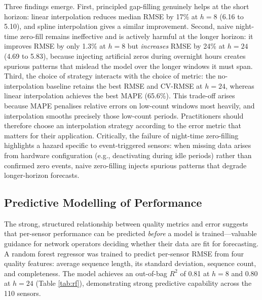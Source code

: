 \documentclass[journal,sensors,submit,pdftex,moreauthors]{Definitions/mdpi}
\begin{document}
Three findings emerge. First, principled gap-filling genuinely helps at the short horizon: linear interpolation reduces median RMSE by 17\% at $h=8$ (6.16 to 5.10), and spline interpolation gives a similar improvement. Second, naive night-time zero-fill remains ineffective and is actively harmful at the longer horizon: it improves RMSE by only 1.3\% at $h=8$ but \emph{increases} RMSE by 24\% at $h=24$ (4.69 to 5.83), because injecting artificial zeros during overnight hours creates spurious patterns that mislead the model over the longer windows it must span. Third, the choice of strategy interacts with the choice of metric: the no-interpolation baseline retains the best RMSE and CV-RMSE at $h=24$, whereas linear interpolation achieves the best MAPE (65.6\%). This trade-off arises because MAPE penalises relative errors on low-count windows most heavily, and interpolation smooths precisely those low-count periods. Practitioners should therefore choose an interpolation strategy according to the error metric that matters for their application. Critically, the failure of night-time zero-filling highlights a hazard specific to event-triggered sensors: when missing data arises from hardware configuration (e.g., deactivating during idle periods) rather than confirmed zero events, naive zero-filling injects spurious patterns that degrade longer-horizon forecasts.

\subsection{Predictive Modelling of Performance}

The strong, structured relationship between quality metrics and error suggests that per-sensor performance can be predicted \emph{before} a model is trained---valuable guidance for network operators deciding whether their data are fit for forecasting. A random forest regressor \citep{breimanRandomForests2001,pedregosaScikitlearnMachineLearning} was trained to predict per-sensor RMSE from four quality features: average sequence length, its standard deviation, sequence count, and completeness. The model achieves an out-of-bag $R^2$ of 0.81 at $h=8$ and 0.80 at $h=24$ (Table \ref{tab:rf}), demonstrating strong predictive capability across the 110 sensors.
\end{document}
